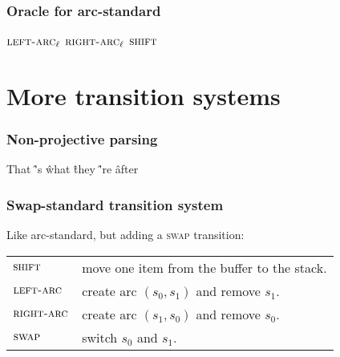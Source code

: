 \documentclass[t]{beamer}
\begin{document}
\begin{frame}
    \frametitle{Oracle for arc-standard}
    \begin{algorithmic}[1]
            \RETURN $\textsc{left-arc}_\ell$
            \RETURN $\textsc{right-arc}_\ell$
        \ELSE
            \RETURN $\textsc{shift}$
        \ENDIF
    \ENDWHILE
    \end{algorithmic}
\end{frame}


\section{More transition systems}

\begin{frame}
  \frametitle{Non-projective parsing}
  \begin{center}
    \begin{dependency}
      \begin{deptext}[column sep=1.5em,ampersand replacement=\^,font=\rmfamily]
        That \^ 's \^ what \^ they \^ 're \^ after \\
      \end{deptext}
    \end{dependency}
  \end{center}
\end{frame}

\begin{frame}
  \frametitle{Swap-standard transition system}
  Like arc-standard, but adding a \textsc{swap} transition:

  \begin{tabular}{ll}
    $\textsc{shift}$ & move one item from the buffer to the stack. \\
    $\textsc{left-arc}$ & create arc $(s_0, s_1)$ and remove $s_1$. \\
    $\textsc{right-arc}$ & create arc $(s_1, s_0)$ and remove $s_0$. \\
    $\textsc{swap}$ & switch $s_0$ and $s_1$.
  \end{tabular}
\end{frame}
\end{document}
